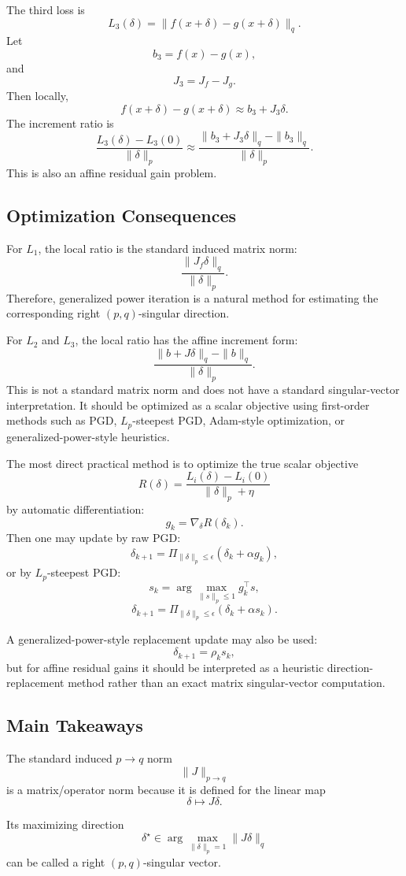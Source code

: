 \documentclass{article}
\begin{document}
The third loss is
\[
L_3(\delta)
=
\|f(x+\delta)-g(x+\delta)\|_q.
\]
Let
\[
b_3=f(x)-g(x),
\]
and
\[
J_3=J_f-J_g.
\]
Then locally,
\[
f(x+\delta)-g(x+\delta)
\approx
b_3+J_3\delta.
\]
The increment ratio is
\[
\frac{
L_3(\delta)-L_3(0)
}{
\|\delta\|_p
}
\approx
\frac{
\|b_3+J_3\delta\|_q-\|b_3\|_q
}{
\|\delta\|_p
}.
\]
This is also an affine residual gain problem.

\subsection{Optimization Consequences}

For $L_1$, the local ratio is the standard induced matrix norm:
\[
\frac{\|J_f\delta\|_q}{\|\delta\|_p}.
\]
Therefore, generalized power iteration is a natural method for estimating the corresponding right $(p,q)$-singular direction.

For $L_2$ and $L_3$, the local ratio has the affine increment form:
\[
\frac{
\|b+J\delta\|_q-\|b\|_q
}{
\|\delta\|_p
}.
\]
This is not a standard matrix norm and does not have a standard singular-vector interpretation. It should be optimized as a scalar objective using first-order methods such as PGD, $L_p$-steepest PGD, Adam-style optimization, or generalized-power-style heuristics.

The most direct practical method is to optimize the true scalar objective
\[
R(\delta)
=
\frac{
L_i(\delta)-L_i(0)
}{
\|\delta\|_p+\eta
}
\]
by automatic differentiation:
\[
g_k=\nabla_\delta R(\delta_k).
\]
Then one may update by raw PGD:
\[
\delta_{k+1}
=
\Pi_{\|\delta\|_p\le\epsilon}
(\delta_k+\alpha g_k),
\]
or by $L_p$-steepest PGD:
\[
s_k=
\arg\max_{\|s\|_p\le1}g_k^\top s,
\]
\[
\delta_{k+1}
=
\Pi_{\|\delta\|_p\le\epsilon}
(\delta_k+\alpha s_k).
\]

A generalized-power-style replacement update may also be used:
\[
\delta_{k+1}
=
\rho_k s_k,
\]
but for affine residual gains it should be interpreted as a heuristic direction-replacement method rather than an exact matrix singular-vector computation.

\subsection{Main Takeaways}

The standard induced $p\to q$ norm
\[
\|J\|_{p\to q}
\]
is a matrix/operator norm because it is defined for the linear map
\[
\delta\mapsto J\delta.
\]

Its maximizing direction
\[
\delta^\star
\in
\arg\max_{\|\delta\|_p=1}\|J\delta\|_q
\]
can be called a right $(p,q)$-singular vector.
\end{document}
